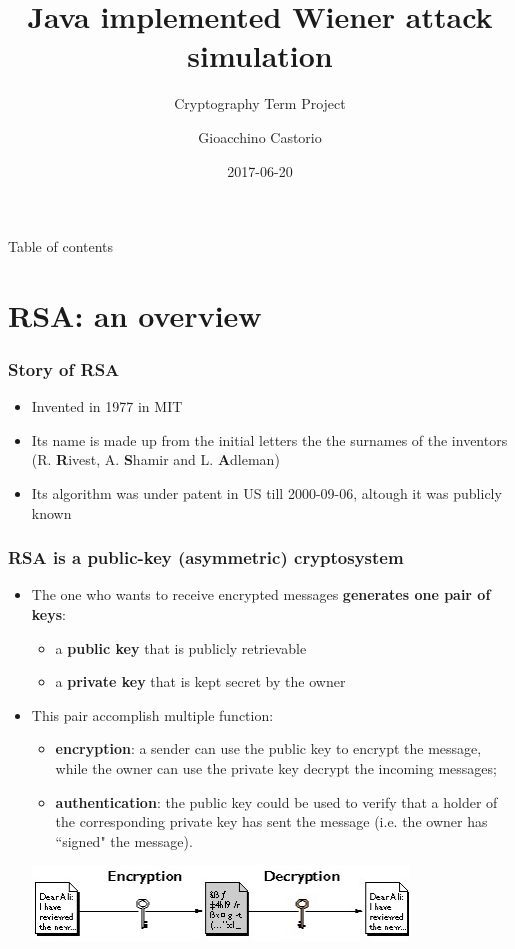 \documentclass{beamer}
\title{Java implemented Wiener attack simulation}
\subtitle{Cryptography Term Project}
\author{Gioacchino Castorio}
\institute{Università dell'Aquila}
\date{2017-06-20}
\begin{document}
\frame{\titlepage}

\begin{frame}{Table of contents}
\tableofcontents
\end{frame}

\section{RSA: an overview}

\frame{\sectionpage}


	\begin{frame}
    \frametitle{Story of RSA}
    \begin{itemize}
     	\item Invented in 1977 in MIT
     	\item Its name is made up from the initial letters the the surnames of the inventors (R. \textbf{R}ivest, A. \textbf{S}hamir and L. \textbf{A}dleman)
     	\item Its algorithm was under patent in US till 2000-09-06, altough it was publicly known
    \end{itemize}
  \end{frame}
  
  
  \begin{frame}
    \frametitle{RSA is a public-key (asymmetric) cryptosystem}
    \begin{itemize}
    		\item The one who wants to receive encrypted messages \textbf{generates one pair of keys}: 
    		\begin{itemize}
    			\item a \textbf{public key} that is publicly retrievable
    			\item a \textbf{private key} that is kept secret by the owner
    		\end{itemize} 	 
    		\item This pair accomplish multiple function:
    		\begin{itemize}
    			\item \textbf{encryption}: a sender can use the public key to encrypt the message, while the owner can use the private key decrypt the incoming messages;
    			\item \textbf{authentication}: the public key could be used to verify that a holder of the corresponding private key has sent the message (i.e. the owner has ``signed" the message).
    		\end{itemize}
    		
    		\begin{center}
    		 \includegraphics[height=2cm, width=10cm]{img/ciclo_criptazione}
    		\end{center}
    		 
    		
    \end{itemize}
  \end{frame}
  
\end{document}
